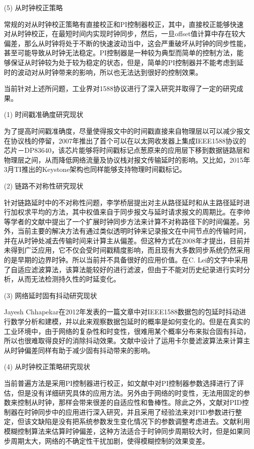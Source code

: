 (5) 从时钟校正策略

常规的对从时钟校正策略有直接校正和PI控制器校正，其中，直接校正能够快速对从时钟校正，在最短时间内实现时钟同步，然后，一旦offset值计算中存在较大偏差，那么从时钟将处于不断的快速波动当中，这会严重破坏从时钟的同步性能，甚至可能导致从时钟无法稳定。PI控制器是一种较为典型而简单的控制方法，能够保证从时钟较为处于较为稳定的状态，但是，简单的PI控制器并不能考虑到延时的波动对从时钟带来的影响，所以也无法达到很好的控制效果。

当前针对上述所问题，工业界对1588协议进行了深入研究并取得了一定的研究成果。

(1) 时间戳准确度研究现状

为了提高时间戳准确度，尽量使得报文中的时间戳直接来自物理层以可以减少报文在协议栈的停留，2007年推出了首个可以在以太网收发器上集成IEEE1588协议的芯片－DP83640\supercite{4}，该芯片能够将时间戳标记点葱原来的应用层下移到数据链路层和物理层之间，从而降低网络流量及协议栈对报文传输延时的影响。又比如，2015年3月TI推出的Keystone架构也同样能够支持物理时间戳标记\supercite{5}。

(2) 链路不对称性研究现状

针对链路延时中的不对称性问题，李学桥层提出对主从路径延时和从主路径延时进行加权求平均的方法，其中权值来自于同步报文与延时请求报文的周期比\supercite{6}。在李帅等学者的文献\parencite{7}中提出了一个扩展时钟同步方法来计算不对称路径下的时间偏差。另外，当前主要的解决方法有通过类似透明时钟来记录报文在中间节点的传输时间，并在从时钟处减去传输时间来计算主从偏差。但这种方式在2008年才提出，目前并未得到广泛应用，它不仅会受时间戳精度影响，而且现有大多数同步系统仍然采用的是早期的边界时钟。所以当前并不具备很好的应用价值。在C. Lei的文字\supercite{57}中采用了自适应滤波算法，该算法能较好的进行滤波，但由于不能对历史纪录进行实时分析，从而无法检测持久性的时延变化。

(3) 网络延时固有抖动研究现状

Jayesh Chhapekar在2012年发表的一篇文章中对IEEE1588数据包的包延时抖动进行数学分析和建模，并以此来观察数据包延时的概率是如何变化的\supercite{8}。但是在真实的工业环境中，由于网络的复杂性和时变性，很难用某个概率分布来拟合固有抖动，所以也很难取得良好的消除抖动效果。文献\parencite{9}中设计了运用卡尔曼滤波算法来计算主从时钟偏差同样有助于减少固有抖动带来的影响。

(4) 从时钟校正策略研究现状

当前普遍方法是采用PI控制器进行校正，如文献\parencite{10}中对PI控制器参数选择进行了评估，但是没有详细研究具体的应用方法。另外由于网络的时变性，无法用固定的参数来控制从时钟，那样会带来很差的自适应性和鲁棒性。除此之外，文献\parencite{11}对PID控制器在时钟同步中的应用进行深入研究，并且采用了经验法来对PID参数进行整定，但该文缺陷是没有把系统参数发生变化情况下的参数调整考虑进去。文献\parencite{12}利用模糊控制算法来估算时钟偏差，这种方法适合于时钟同步周期较大时，但是如果同步周期太大，网络的不确定性干扰加剧，使得模糊控制的效果变差。


